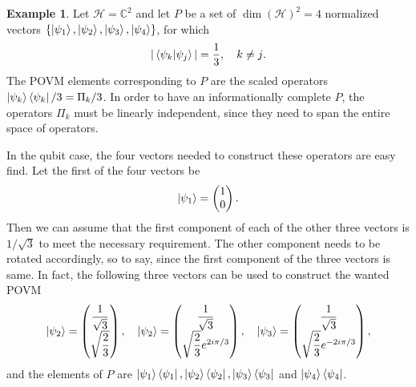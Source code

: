 \documentclass[a4paper,12pt]{wihuri}
\theoremstyle{definition}
\newtheorem{example}{Example}
\numberwithin{definition}{section}
\numberwithin{example}{section}
\numberwithin{theorem}{section}
\numberwithin{proposition}{section}
\numberwithin{lemma}{section}
\newcommand{\hi}{\mathcal{H}}%
\begin{document}
\begin{example}
Let $\hi = \mathbb{C}^2$ and let $P$ be a set of $\dim (\hi)^2 = 4$ normalized vectors $\lbrace \ket{\psi_1}, \ket{\psi_2}, \ket{\psi_3}, \ket{\psi_4} \rbrace$, for which
\begin{align*}
|\braket{\psi_k | \psi_j }| = \dfrac{1}{3},\quad k \neq j\text.
\end{align*}
The POVM elements corresponding to $P$ are the scaled operators $\ket{\psi_k}\bra{\psi_k}/3 = \Pi_k/3$. In order to have an informationally complete $P$, the operators $\Pi_k$ must be linearly independent, since they need to span the entire space of operators.\cite{sic_povm}  

In the qubit case, the four vectors needed to construct these operators are easy find. Let the first of the four vectors be 
\begin{align*}
\ket{\psi_1} = \begin{pmatrix}
1\\
0
\end{pmatrix}\text.
\end{align*}
Then we can assume that the first component of each of the other three vectors is $1/\sqrt{3}$ to meet the necessary requirement. The other component needs to be rotated accordingly, so to say, since the first component of the three vectors is same. In fact, the following three vectors can be used to construct the wanted POVM
\begin{align*}
\ket{\psi_2} = \begin{pmatrix}
\dfrac{1}{\sqrt{3}}\\
\sqrt{\dfrac{2}{3}}
\end{pmatrix},\quad \ket{\psi_2} = \begin{pmatrix}
\dfrac{1}{\sqrt{3}}\\
\sqrt{\dfrac{2}{3}}e^{2i\pi/3}
\end{pmatrix},\quad \ket{\psi_3} = \begin{pmatrix}
\dfrac{1}{\sqrt{3}}\\
\sqrt{\dfrac{2}{3}}e^{-2i\pi/3}
\end{pmatrix},
\end{align*}
and the elements of $P$ are $\ket{\psi_1}\bra{\psi_1}, \ket{\psi_2}\bra{\psi_2}, \ket{\psi_3}\bra{\psi_3}$ and $\ket{\psi_4}\bra{\psi_4}$.




\end{example}
\end{document}
